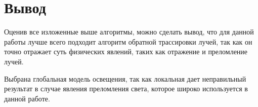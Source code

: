     \section{Вывод}
        
        Оценив все изложенные выше алгоритмы, можно сделать вывод, что для данной работы лучше всего подходит алгоритм обратной трассировки лучей, так как он точно отражает суть физических явлений, таких как отражение и преломление лучей.

        Выбрана глобальная модель освещения, так как локальная дает неправильный результат в случае явления преломления света, которое широко используется в данной работе.